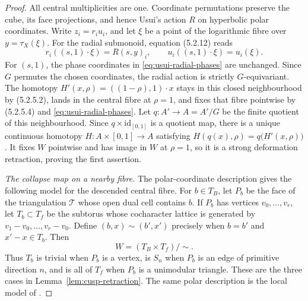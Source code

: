\begin{proof}
All central multiplicities are one.  Coordinate permutations preserve the
cube, its face projections, and hence Usui's action $R$ on hyperbolic
polar coordinates.  Write $z_i=r_iu_i$, and let $\xi$ be a point of the
logarithmic fibre over $y=\tau_X(\xi)$.  For the radial submonoid,
equation (5.2.12) reads
\begin{equation}\label{eq:usui-radial-phases}
 r_i((s,1)\cdot\xi)=R(s,y)_i,
 \qquad u_i((s,1)\cdot\xi)=u_i(\xi).
\end{equation}
For $(s,1)$, the phase coordinates in
\eqref{eq:usui-radial-phases} are unchanged.  Since $G$ permutes the chosen
coordinates, the radial action is strictly $G$-equivariant.  The homotopy
$H'(x,\rho)=((1-\rho),1)\cdot x$ stays in this closed neighbourhood by (5.2.5.2),
lands in the central fibre at $\rho=1$, and fixes that fibre pointwise by
(5.2.5.4) and \eqref{eq:usui-radial-phases}.  Let $q:A'\to A=A'/G$ be the
finite quotient of this neighbourhood.  Since $q\times\mathrm{id}_{[0,1]}$ is
a quotient map, there is a unique continuous homotopy
$H:A\times[0,1]\to A$ satisfying
$H(q(x),\rho)=q\bigl(H'(x,\rho)\bigr)$.
It fixes $W$ pointwise and has image in $W$ at $\rho=1$, so it is a
strong deformation retraction, proving the first assertion.

\smallskip
\noindent\emph{The collapse map on a nearby fibre.}
The polar-coordinate description gives the following model for the descended
central fibre.  For $b\in T_B$, let $P_b$ be the face of the
triangulation $\mathcal T$ whose open dual cell contains $b$.  If
$P_b$ has vertices $v_0,\ldots,v_r$, let $T_b\subset T_f$ be the
subtorus whose cocharacter lattice is generated by
$v_1-v_0,\ldots,v_r-v_0$.  Define
$(b,x)\sim(b',x')$ precisely when $b=b'$ and $x'-x\in T_b$.  Then
\begin{equation}\label{eq:cusp-collapse-quotient}
 W=(T_B\times T_f)/{\sim}.
\end{equation}
Thus $T_b$ is trivial when $P_b$ is a vertex, is $S_n$ when $P_b$
is an edge of primitive direction $n$, and is all of $T_f$ when
$P_b$ is a unimodular triangle.  These are the three cases in
Lemma~\ref{lem:cusp-retraction}.  The same polar description is the local
model of \citep[Proposition~3.1 and Theorems~3.7, 5.1]{NakayamaOgus2010}.


\end{proof}
